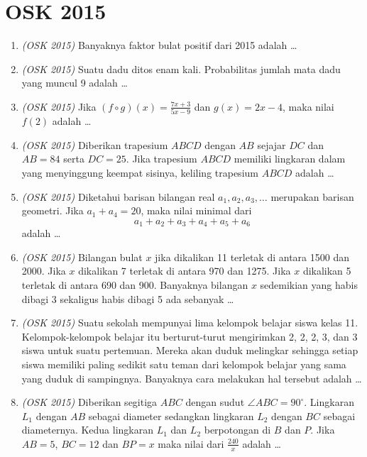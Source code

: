\documentclass[11pt]{scrartcl}
\begin{document}
\section{OSK 2015}
\begin{enumerate}

\item \textit{(OSK 2015)} Banyaknya faktor bulat positif dari 2015 adalah \dots

\item \textit{(OSK 2015)} Suatu dadu ditos enam kali. Probabilitas jumlah mata dadu yang muncul 9 adalah \dots

\item \textit{(OSK 2015)} Jika $(f \circ g)(x) = \frac{7x + 3}{5x - 9}$ dan $g(x) = 2x - 4$, maka nilai $f(2)$ adalah \dots

\item \textit{(OSK 2015)} Diberikan trapesium $ABCD$ dengan $AB$ sejajar $DC$ dan $AB = 84$ serta $DC = 25$. Jika trapesium $ABCD$ memiliki lingkaran dalam yang menyinggung keempat sisinya, keliling trapesium $ABCD$ adalah \dots

\item \textit{(OSK 2015)} Diketahui barisan bilangan real $a_1, a_2, a_3, \ldots$ merupakan barisan geometri. Jika $a_1 + a_4 = 20$, maka nilai minimal dari
\[
a_1 + a_2 + a_3 + a_4 + a_5 + a_6
\]
adalah \dots

\item \textit{(OSK 2015)} Bilangan bulat $x$ jika dikalikan 11 terletak di antara 1500 dan 2000. Jika $x$ dikalikan 7 terletak di antara 970 dan 1275. Jika $x$ dikalikan 5 terletak di antara 690 dan 900. Banyaknya bilangan $x$ sedemikian yang habis dibagi 3 sekaligus habis dibagi 5 ada sebanyak \dots

\item \textit{(OSK 2015)} Suatu sekolah mempunyai lima kelompok belajar siswa kelas 11. Kelompok-kelompok belajar itu berturut-turut mengirimkan 2, 2, 2, 3, dan 3 siswa untuk suatu pertemuan. Mereka akan duduk melingkar sehingga setiap siswa memiliki paling sedikit satu teman dari kelompok belajar yang sama yang duduk di sampingnya. Banyaknya cara melakukan hal tersebut adalah \dots

\item \textit{(OSK 2015)} Diberikan segitiga $ABC$ dengan sudut $\angle ABC = 90^\circ$. Lingkaran $L_1$ dengan $AB$ sebagai diameter sedangkan lingkaran $L_2$ dengan $BC$ sebagai diameternya. Kedua lingkaran $L_1$ dan $L_2$ berpotongan di $B$ dan $P$. Jika $AB = 5$, $BC = 12$ dan $BP = x$ maka nilai dari $\frac{240}{x}$ adalah \dots


\end{enumerate}
\end{document}
